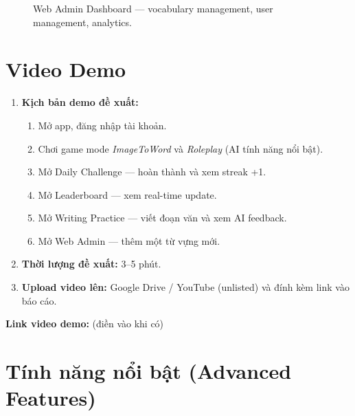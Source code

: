 \documentclass[12pt,a4paper]{article}
\begin{document}
\begin{figure}[H]
\centering
\caption{Web Admin Dashboard — vocabulary management, user management, analytics.}
\end{figure}

\section{Video Demo}
\label{sec:demo}

\begin{tcolorbox}[colback=boxbg, colframe=vfblue, title={\textbf{Hướng dẫn Demo}},
  fonttitle=\bfseries]
\begin{enumerate}
  \item \textbf{Kịch bản demo đề xuất:}
    \begin{enumerate}[label=\alph*.]
      \item Mở app, đăng nhập tài khoản.
      \item Chơi game mode \textit{ImageToWord} và \textit{Roleplay} (AI tính năng nổi bật).
      \item Mở Daily Challenge — hoàn thành và xem streak +1.
      \item Mở Leaderboard — xem real-time update.
      \item Mở Writing Practice — viết đoạn văn và xem AI feedback.
      \item Mở Web Admin — thêm một từ vựng mới.
    \end{enumerate}
  \item \textbf{Thời lượng đề xuất:} 3–5 phút.
  \item \textbf{Upload video lên:} Google Drive / YouTube (unlisted) và đính kèm link vào báo cáo.
\end{enumerate}
\end{tcolorbox}

\vspace{0.5cm}
\textbf{Link video demo:} \underline{\hspace{8cm}} (điền vào khi có)

\section{Tính năng nổi bật (Advanced Features)}
\label{sec:advanced}
\end{document}
